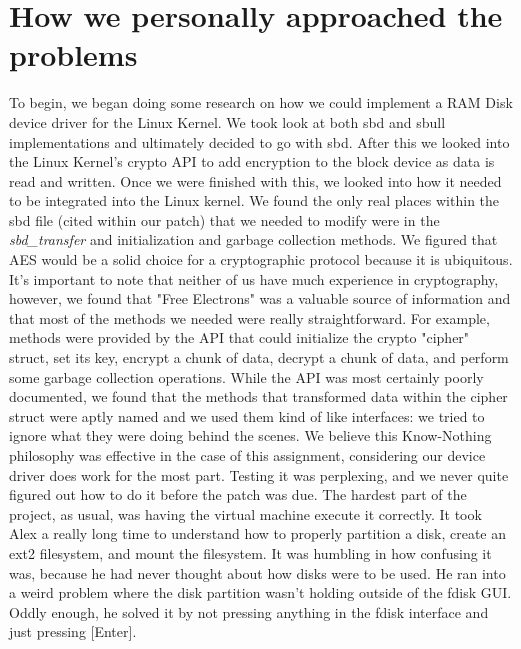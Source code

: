 \documentclass[letterpaper,10pt,titlepage]{article}
\begin{document}
\section{How we personally approached the problems}
To begin, we began doing some research on how we could implement a RAM Disk device driver for the Linux Kernel. We took look at both sbd and sbull implementations and ultimately decided to go with sbd. After this we looked into the Linux Kernel's crypto API to add encryption to the block device as data is read and written. Once we were finished with this, we looked into how it needed to be integrated into the Linux kernel. We found the only real places within the sbd file (cited within our patch) that we needed to modify were in the \emph{sbd\_transfer} and initialization and garbage collection methods. We figured that AES would be a solid choice for a cryptographic protocol because it is ubiquitous. It's important to note that neither of us have much experience in cryptography, however, we found that "Free Electrons" was a valuable source of information and that most of the methods we needed were really straightforward. For example, methods were provided by the API that could initialize the crypto "cipher" struct, set its key, encrypt a chunk of data, decrypt a chunk of data, and perform some garbage collection operations. While the API was most certainly poorly documented, we found that the methods that transformed data within the cipher struct were aptly named and we used them kind of like interfaces: we tried to ignore what they were doing behind the scenes. We believe this Know-Nothing philosophy was effective in the case of this assignment, considering our device driver does work for the most part. Testing it was perplexing, and we never quite figured out how to do it before the patch was due. The hardest part of the project, as usual, was having the virtual machine execute it correctly. It took Alex a really long time to understand how to properly partition a disk, create an ext2 filesystem, and mount the filesystem. It was humbling in how confusing it was, because he had never thought about how disks were to be used. He ran into a weird problem where the disk partition wasn't holding outside of the fdisk GUI. Oddly enough, he solved it by not pressing anything in the fdisk interface and just pressing [Enter]. 
\end{document}
